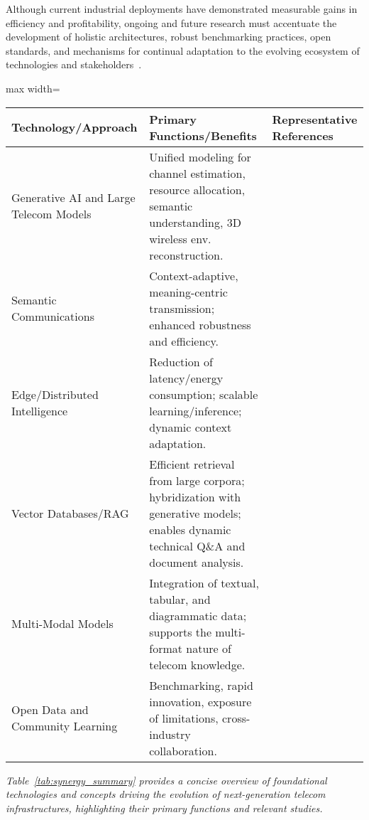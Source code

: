 \documentclass[sigconf]{acmart}
\begin{document}
Although current industrial deployments have demonstrated measurable gains in efficiency and profitability, ongoing and future research must accentuate the development of holistic architectures, robust benchmarking practices, open standards, and mechanisms for continual adaptation to the evolving ecosystem of technologies and stakeholders~\cite{ref11,ref21,ref22,ref23,ref24,ref25,ref49}.

\begin{table*}[htbp]
\centering
\caption{Summary of Key Synergistic Technologies and Their Roles in Next-Gen Telecom}
\label{tab:synergy_summary}
\begin{adjustbox}{max width=\textwidth}
\begin{tabular}{lll}
\toprule
\textbf{Technology/Approach} & \textbf{Primary Functions/Benefits} & \textbf{Representative References} \\
\midrule
Generative AI and Large Telecom Models  & Unified modeling for channel estimation, resource allocation, semantic understanding, 3D wireless env. reconstruction. & \cite{ref24,ref20,ref26} \\
Semantic Communications   & Context-adaptive, meaning-centric transmission; enhanced robustness and efficiency. & \cite{ref20,ref26} \\
Edge/Distributed Intelligence & Reduction of latency/energy consumption; scalable learning/inference; dynamic context adaptation. & \cite{ref12,ref14,ref19,ref21,ref25} \\
Vector Databases/RAG  & Efficient retrieval from large corpora; hybridization with generative models; enables dynamic technical Q\&A and document analysis. & \cite{ref11,ref22,ref23,ref29} \\
Multi-Modal Models  & Integration of textual, tabular, and diagrammatic data; supports the multi-format nature of telecom knowledge. & \cite{ref21,ref29} \\
Open Data and Community Learning & Benchmarking, rapid innovation, exposure of limitations, cross-industry collaboration. & \cite{ref11,ref21,ref22,ref23} \\
\bottomrule
\end{tabular}
\end{adjustbox}
\end{table*}

\textit{Table~\ref{tab:synergy_summary} provides a concise overview of foundational technologies and concepts driving the evolution of next-generation telecom infrastructures, highlighting their primary functions and relevant studies.}
\end{document}
